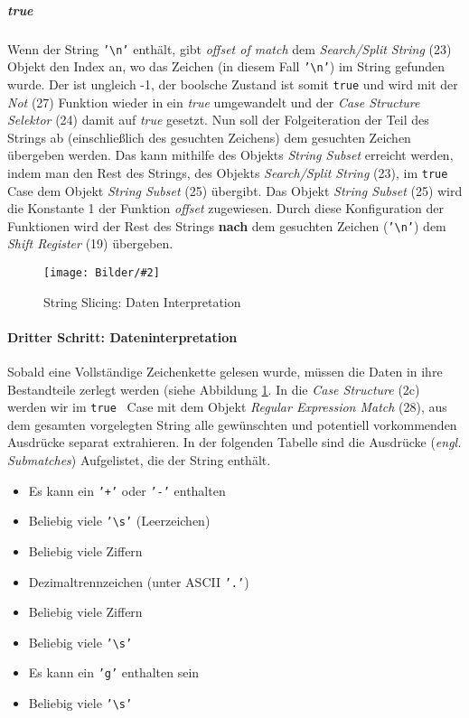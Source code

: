 \documentclass[
fontsize=12pt, 
paper=a4, 
BCOR=10mm, 
twoside=false,
 DIV=10, 
 headsepline, 
 footsepline
 ]{scrartcl}
\def\bild#1#2#3#4#5#6{%
\begin{figure}[h!] %
\centering
\texttt{[image: Bilder/\#2]}
\vspace{#3}
\caption[#4]{#5}\label{#6}
\end{figure}
}
\begin{document}
\subparagraph*{true} Wenn der String \texttt{'\textbackslash n'} enthält, gibt \textit{offset of match} dem \textit{Search/Split String} (23) Objekt den Index an, wo das Zeichen (in diesem Fall \texttt{'\textbackslash n'}) im String gefunden wurde. Der ist ungleich -1, der boolsche Zustand ist somit \texttt{true} und wird mit der \textit{Not} (27) Funktion wieder in ein \textit{true} umgewandelt und der \textit{Case Structure Selektor} (24) damit auf \textit{true} gesetzt. Nun soll der Folgeiteration der Teil des Strings ab (einschließlich des gesuchten Zeichens) dem gesuchten Zeichen übergeben werden. Das kann mithilfe des Objekts \textit{String Subset} erreicht werden, indem man den Rest des Strings, des Objekts \textit{Search/Split String} (23), im \texttt{true} Case dem Objekt \textit{String Subset} (25) übergibt. Das Objekt \textit{String Subset} (25) wird die Konstante 1 der Funktion \textit{offset} zugewiesen. Durch diese Konfiguration der Funktionen wird der Rest des Strings \textbf{nach} dem gesuchten Zeichen (\texttt{'\textbackslash n'}) dem \textit{Shift Register} (19) übergeben.

 \bild{1}
{LabVIEW_serialport/step7.png}
{0em}
{\glqq String Slicing\grqq{}: Daten Interpretation}
{\glqq String Slicing\grqq{}: Daten Interpretation}
{step7}

\paragraph{Dritter Schritt: \glqq Dateninterpretation\grqq{}} Sobald eine Vollständige Zeichenkette gelesen wurde, müssen die Daten in ihre Bestandteile zerlegt werden (siehe Abbildung \ref{step7}. In die \textit{Case Structure} (2c) werden wir im \texttt{true} \, Case mit dem Objekt \textit{Regular Expression Match} (28), aus dem gesamten vorgelegten String alle gewünschten und potentiell vorkommenden Ausdrücke separat extrahieren. In der folgenden Tabelle sind die Ausdrücke (\textit{engl. Submatches}) Aufgelistet, die der String enthält.

\begin{itemize}
\item Es kann ein \texttt{'+'} oder \texttt{'-'} enthalten
\item Beliebig viele \texttt{'\textbackslash s'} (Leerzeichen)
\item Beliebig viele Ziffern
\item Dezimaltrennzeichen (unter ASCII \texttt{'.'})
\item Beliebig viele Ziffern
\item Beliebig viele \texttt{'\textbackslash s'}
\item Es kann ein \texttt{'g'} enthalten sein
\item Beliebig viele \texttt{'\textbackslash s'}
\end{itemize}
\end{document}

